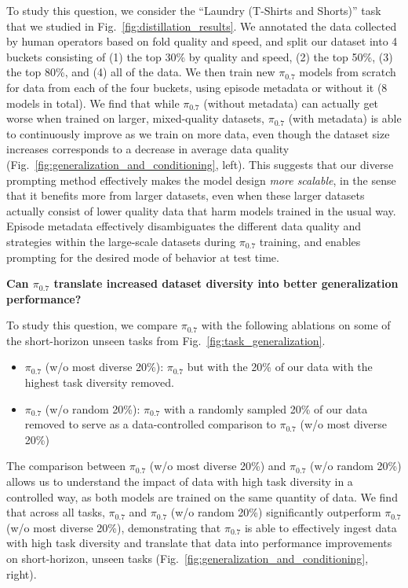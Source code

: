 \documentclass[conference]{IEEEtran}
\def \MethodName {$\pi_{0.7}$}
\begin{document}
To study this question, we consider the ``Laundry (T-Shirts and Shorts)'' task that we studied in Fig.~\ref{fig:distillation_results}. We annotated the data collected by human operators based on fold quality and speed, and split our dataset into 4 buckets consisting of (1) the top 30\% by quality and speed, (2) the top 50\%, (3) the top 80\%, and (4) all of the data. We then train new \MethodName{} models from scratch for data from each of the four buckets, using episode metadata or without it (8 models in total).
We find that while \MethodName{} (without metadata) can actually get worse when trained on larger, mixed-quality datasets, \MethodName{} (with metadata) is able to continuously improve as we train on more data, even though the dataset size increases corresponds to a decrease in average data quality (Fig.~\ref{fig:generalization_and_conditioning}, left). This suggests that our diverse prompting method effectively makes the model design \emph{more scalable}, in the sense that it benefits more from larger datasets, even when these larger datasets actually consist of lower quality data that harm models trained in the usual way. Episode metadata effectively disambiguates the different data quality and strategies within the large-scale datasets during \MethodName{} training, and enables prompting for the desired mode of behavior at test time.

\noindent \textbf{Can \MethodName{} translate increased dataset diversity into better generalization performance?}

To study this question, we compare \MethodName{} with the following ablations on some of the short-horizon unseen tasks from Fig.~\ref{fig:task_generalization}.
\begin{itemize}
    \item \MethodName{} (w/o most diverse 20\%): \MethodName{} but with the 20\% of our data with the highest task diversity removed.
    \item \MethodName{} (w/o random 20\%): \MethodName{} with a randomly sampled 20\% of our data removed to serve as a data-controlled comparison to \MethodName{} (w/o most diverse 20\%)
\end{itemize}

The comparison between \MethodName{} (w/o most diverse 20\%) and \MethodName{} (w/o random 20\%) allows us to understand the impact of data with high task diversity in a controlled way, as both models are trained on the same quantity of data. We find that across all tasks, \MethodName{} and \MethodName{} (w/o random 20\%) significantly outperform \MethodName{} (w/o most diverse 20\%), demonstrating that \MethodName{} is able to effectively ingest data with high task diversity and translate that data into performance improvements on short-horizon, unseen tasks (Fig.~\ref{fig:generalization_and_conditioning}, right).
\end{document}
